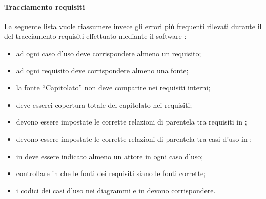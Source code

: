 \documentclass[12pt,a4paper]{article}
\begin{document}
\paragraph{Tracciamento requisiti}
La seguente lista vuole riassumere invece gli  errori più frequenti rilevati durante il  del tracciamento requisiti effettuato mediante il software :
\begin{itemize}
	\item ad ogni caso d’uso deve corrispondere almeno un requisito;
	\item ad ogni requisito deve corrispondere almeno una fonte; 
	\item la fonte “Capitolato” non deve comparire nei requisiti interni; 
	\item deve esserci copertura totale del capitolato nei requisiti;
	\item devono essere impostate le corrette relazioni di parentela tra requisiti in ; 
	\item devono essere impostate le corrette relazioni di parentela tra casi d’uso in ; 
	\item in  deve essere indicato almeno un attore in ogni caso d’uso;
	\item controllare in  che le fonti dei requisiti siano le fonti corrette; 
	\item i codici dei casi d’uso nei diagrammi e in  devono corrispondere.
\end{itemize}
\end{document}

